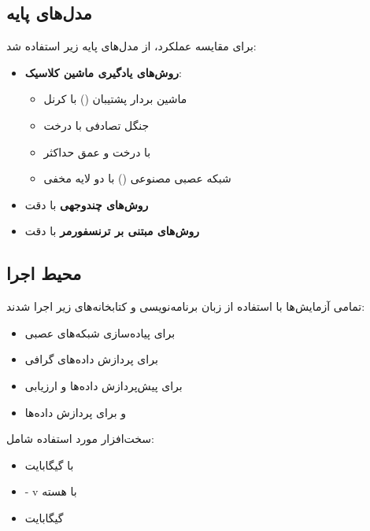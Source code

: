 \subsection{مدل‌های پایه}
برای مقایسه عملکرد، از مدل‌های پایه زیر استفاده شد:
\begin{itemize}
    \renewcommand{\labelitemi}{\lr{$\bullet$}}
    \item \textbf{روش‌های یادگیری ماشین کلاسیک}:
    \begin{itemize}
        \renewcommand{\labelitemii}{\lr{$\bullet$}}
        \item ماشین بردار پشتیبان () با کرنل 
        \item جنگل تصادفی  با  درخت
        \item {} با  درخت و عمق حداکثر 
        \item شبکه عصبی مصنوعی () با دو لایه مخفی
    \end{itemize}
    \item \textbf{روش‌های چندوجهی} با دقت  \cite{Alsaleh2023}    
    \item \textbf{روش‌های مبتنی بر ترنسفورمر} با دقت  \cite{TransformerMalware}
\end{itemize}

\subsection{محیط اجرا}
تمامی آزمایش‌ها با استفاده از زبان برنامه‌نویسی   و کتابخانه‌های زیر اجرا شدند:
\begin{itemize}
    \renewcommand{\labelitemi}{\lr{$\bullet$}}
    \item {}  برای پیاده‌سازی شبکه‌های عصبی
    \item {}  برای پردازش داده‌های گرافی
    \item {}  برای پیش‌پردازش داده‌ها و ارزیابی
    \item {}  و   برای پردازش داده‌ها
\end{itemize}

سخت‌افزار مورد استفاده شامل:
\begin{itemize}
    \renewcommand{\labelitemi}{\lr{$\bullet$}}
    \item {}  با  گیگابایت 
    \item {} - v با  هسته
    \item {} گیگابایت 
\end{itemize}

